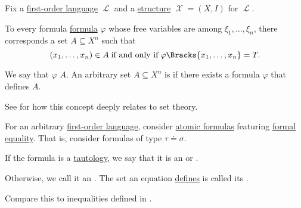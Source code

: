 \begin{definition}\label{def:first_order_definability}
  Fix a \hyperref[def:first_order_syntax]{first-order language} \( \mscrL \) and a \hyperref[def:first_order_structure]{structure} \( \mscrX = (X, I) \) for \( \mscrL \).

  To every formula \hyperref[def:first_order_syntax]{formula} \( \varphi \) whose free variables are among \( \xi_1, \ldots, \xi_n \), there corresponds a set \( A \subseteq X^n \) such that
  \begin{equation*}
    (x_1, \ldots, x_n) \in A \T{if and only if} \varphi\Bracks{x_1, \ldots, x_n} = T.
  \end{equation*}

  We say that \( \varphi \)  \( A \). An arbitrary set \( A \subseteq X^n \) is  if there exists a formula \( \varphi \) that defines \( A \).

  See  for how this concept deeply relates to set theory.
\end{definition}

\begin{definition}\label{def:equation}\mimprovised
  For an arbitrary \hyperref[def:first_order_syntax]{first-order language}, consider \hyperref[def:first_order_syntax/atomic_formula]{atomic formulas} featuring \hyperref[def:first_order_language/equality]{formal equality}. That is, consider formulas of type \( \tau \doteq \sigma \).

  If the formula is a \hyperref[def:first_order_semantics/tautology]{tautology}, we say that it is an  or .

  Otherwise, we call it an . The set an equation \hyperref[def:first_order_definability]{defines} is called its .
\end{definition}
\begin{comments}
  \item Compare this to inequalities defined in .
\end{comments}

